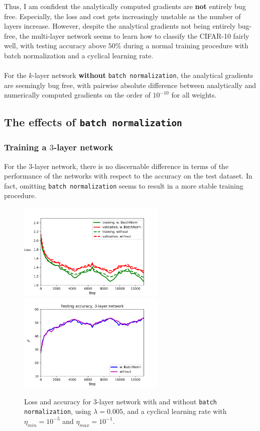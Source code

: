\documentclass{article}
\begin{document}
	Thus, I am confident the analytically computed gradients are \textbf{not} entirely bug free. Especially, the loss and cost gets increasingly unstable as the number of layers increase. However, despite the analytical gradients not being entirely bug-free, the multi-layer network seems to learn how to classify the CIFAR-10 fairly well, with testing accuracy above $50$\% during a normal training procedure with batch normalization and a cyclical learning rate. \\\\
%
For the $k$-layer network \textbf{without} \texttt{batch normalization}, the analytical gradients are seemingly bug free, with pairwise absolute difference between analytically and numerically computed gradients on the order of $10^{-10}$ for all weights.

\newpage
\subsection*{The effects of \texttt{batch normalization}}
\vspace{0.5cm}

\subsubsection*{Training a $3$-layer network}
	For the $3$-layer network, there is no discernable difference in terms of the performance of the networks with respect to the accuracy on the test dataset. In fact, omitting \texttt{batch normalization} seems to result in a more stable training procedure.
	\begin{figure}[h!]
		\centering
		\includegraphics[width=7cm]{../plots/loss_comp_3layer.png}
		\includegraphics[width=7cm]{../plots/acc_comp_3layer.png}
		\caption{Loss and accuracy for $3$-layer network with and without \texttt{batch normalization}, using $\lambda=0.005$, and a cyclical learning rate with $\eta_{min} = 10^{-5}$ and $\eta_{max} = 10^{-1}$.}
	\end{figure}
\end{document}

